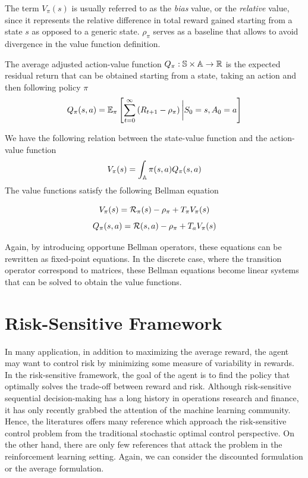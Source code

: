 The term $V_\pi(s)$ is usually referred to as the \emph{bias} value, or the
\emph{relative} value, since it represents the relative difference in total
reward gained starting from a state $s$ as opposed to a generic state. 
$\rho_\pi$ serves as a baseline that allows to avoid divergence in the value
function definition.
\begin{definition}
	The average adjusted action-value function $Q_\pi : \S \times \A \to \R$ is 
	the expected residual return that can be obtained starting from a state,
	taking an action and then following policy $\pi$
	\begin{equation}
		Q_\pi(s, a) = \E[\pi]{\sum^{\infty}_{t=0} \left(R_{t+1} -
			\rho_\pi\right) \bigg| S_0 = s, A_0
		= a}
	\end{equation}
\end{definition}
We have the following relation between the state-value function and the
action-value function
\begin{equation}\label{eq:VQ_equality}
	V_\pi(s) = \int_\A \pi(s,a) Q_\pi(s,a)
\end{equation}
The value functions satisfy the following Bellman equation 
\begin{proposition}
	\begin{equation}
		V_\pi(s) = \calR_\pi(s) - \rho_\pi + T_\pi V_\pi(s)
	\end{equation}
	\begin{equation}
			Q_\pi(s,a) = \calR(s,a) - \rho_\pi + T_a V_\pi(s)
	\end{equation}
\end{proposition}
Again, by introducing opportune Bellman operators, these equations can be rewritten as fixed-point equations. In the discrete case, where the transition operator correspond to matrices, these Bellman equations become linear systems that can be solved to obtain the value functions. 

\section{Risk-Sensitive Framework}
\label{sec:risk_sensitive_formulation}
In many application, in addition to maximizing the average reward, the agent
may want to control risk by minimizing some measure of variability in rewards. In the risk-sensitive framework, the goal of the agent is to find the policy that optimally solves the trade-off between reward and risk. Although risk-sensitive sequential decision-making has a long history in operations research and finance, it has only recently grabbed the attention of the machine learning community. Hence, the literatures offers many reference which approach the risk-sensitive control problem from the traditional stochastic optimal control perspective. On the other hand, there are only few references that attack the problem in the reinforcement learning setting. Again, we can consider the discounted formulation or the average formulation.    

